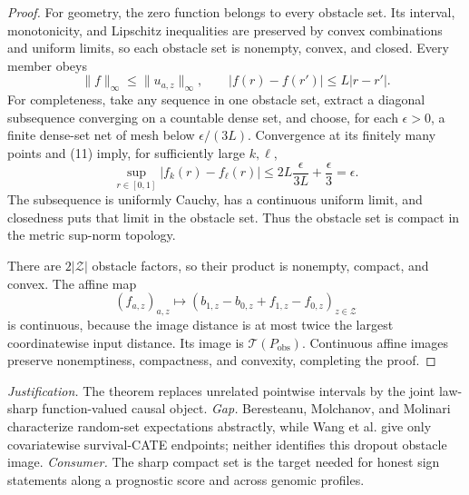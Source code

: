 \documentclass{article}
\begin{document}
\begin{proof}
For geometry, the zero function belongs to every obstacle set.  Its interval, monotonicity, and Lipschitz inequalities are preserved by convex combinations and uniform limits, so each obstacle set is nonempty, convex, and closed.  Every member obeys
\[
\|f\|_\infty\leq\|u_{a,z}\|_\infty,\qquad
|f(r)-f(r')|\leq L|r-r'|.
\tag{11}
\]
For completeness, take any sequence in one obstacle set, extract a diagonal subsequence converging on a countable dense set, and choose, for each \(\epsilon>0\), a finite dense-set net of mesh below \(\epsilon/(3L)\).  Convergence at its finitely many points and (11) imply, for sufficiently large \(k,\ell\),
\[
\sup_{r\in[0,1]}|f_k(r)-f_\ell(r)|
\leq2L\frac{\epsilon}{3L}+\frac{\epsilon}{3}
=\epsilon.
\tag{12}
\]
The subsequence is uniformly Cauchy, has a continuous uniform limit, and closedness puts that limit in the obstacle set.  Thus the obstacle set is compact in the metric sup-norm topology.

There are \(2|\mathcal Z|\) obstacle factors, so their product is nonempty, compact, and convex.  The affine map
\[
(f_{a,z})_{a,z}\longmapsto
(b_{1,z}-b_{0,z}+f_{1,z}-f_{0,z})_{z\in\mathcal Z}
\tag{13}
\]
is continuous, because the image distance is at most twice the largest coordinatewise input distance.  Its image is \(\mathcal T(P_{\mathrm{obs}})\).  Continuous affine images preserve nonemptiness, compactness, and convexity, completing the proof.
\end{proof}
\par\smallskip\noindent \textit{Justification.} The theorem replaces unrelated pointwise intervals by the joint law-sharp function-valued causal object. \textit{Gap.} Beresteanu, Molchanov, and Molinari characterize random-set expectations abstractly, while Wang et al. give only covariatewise survival-CATE endpoints; neither identifies this dropout obstacle image. \textit{Consumer.} The sharp compact set is the target needed for honest sign statements along a prognostic score and across genomic profiles.
\end{document}
